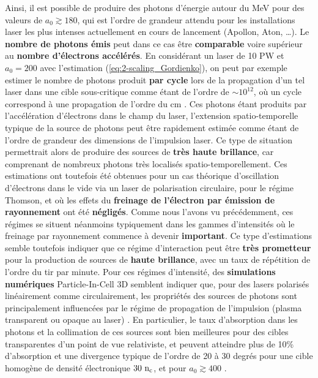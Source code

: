 \begin{refsection}
Ainsi, il est possible de produire des photons d'énergie autour du MeV pour des valeurs de $a_0 \gtrsim 180$, qui est l'ordre de grandeur attendu pour les installations laser les plus intenses actuellement en cours de lancement (Apollon, Aton, …). Le \textbf{nombre de photons émis} peut dans ce cas être \textbf{comparable} voire supérieur au \textbf{nombre d'électrons accélérés}. En considérant un laser de 10 PW et $a_0=200$ avec l'estimation (\ref{eq:2-scaling_Gordienko}), on peut par exemple estimer le nombre de photons produit \textbf{par cycle} lors de la propagation d'un tel laser dans une cible sous-critique comme étant de l'ordre de $\sim 10^{12}$, où un cycle correspond à une propagation de l'ordre du cm \parencite{corde_2013a}. Ces photons étant produits par l'accélération d'électrons dans le champ du laser, l'extension spatio-temporelle typique de la source de photons peut être rapidement estimée comme étant de l'ordre de grandeur des dimensions de l'impulsion laser. Ce type de situation permettrait alors de produire des sources de \textbf{très haute brillance}, car comprenant de nombreux photons très localisés spatio-temporellement. Ces estimations ont toutefois été obtenues pour un cas théorique d'oscillation d'électrons dans le vide via un laser de polarisation circulaire, pour le régime Thomson, et où les effets du \textbf{freinage de l'électron par émission de rayonnement} ont été \textbf{négligés}. Comme nous l'avons vu précédemment, ces régimes se situent néanmoins typiquement dans les gammes d'intensités où le freinage par rayonnement commence à devenir \textbf{important}. Ce type d'estimations semble toutefois indiquer que ce régime d'interaction peut être \textbf{très prometteur} pour la production de sources de \textbf{haute brillance}, avec un taux de répétition de l'ordre du tir par minute. Pour ces régimes d'intensité, des \textbf{simulations numériques} Particle-In-Cell 3D semblent indiquer que, pour des lasers polarisés linéairement comme circulairement, les propriétés des sources de photons sont principalement influencées par le régime de propagation de l'impulsion (plasma transparent ou opaque au laser) \parencite{ji_2014}. En particulier, le taux d'absorption dans les photons et la collimation de ces sources sont bien meilleures pour des cibles transparentes d'un point de vue relativiste, et peuvent atteindre plus de 10\% d'absorption et une divergence typique de l'ordre de 20 à 30 degrés pour une cible homogène de densité électronique $30 ~ \rm n_c$, et pour $a_0 \gtrsim 400$ \parencite{ji_2014}. 

\end{refsection}
